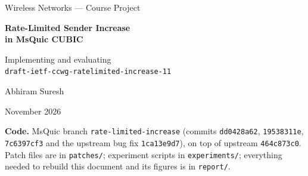 \documentclass[11pt,a4paper]{article}
\begin{document}
\begin{titlepage}
\centering
\vspace*{2.5cm}
{\Large Wireless Networks --- Course Project\par}
\vspace{1.5cm}
{\huge\bfseries Rate-Limited Sender Increase\\[4pt] in MsQuic CUBIC\par}
\vspace{0.8cm}
{\large Implementing and evaluating\\ \texttt{draft-ietf-ccwg-ratelimited-increase-11}\par}
\vspace{2cm}
{\large Abhiram Suresh\par}
\vspace{0.5cm}
{\large November 2026\par}
\vfill
\begin{minipage}{0.85\textwidth}
\small
\textbf{Code.} MsQuic branch \texttt{rate-limited-increase}
(commits \texttt{dd0428a62}, \texttt{19538311e}, \texttt{7c6397cf3} and the
upstream bug fix \texttt{1ca13e9d7}),
on top of upstream \texttt{464c873c0}. Patch files are in
\texttt{patches/}; experiment scripts in \texttt{experiments/};
everything needed to rebuild this document and its figures is in \texttt{report/}.
\end{minipage}
\vspace{1cm}
\end{titlepage}
\end{document}
